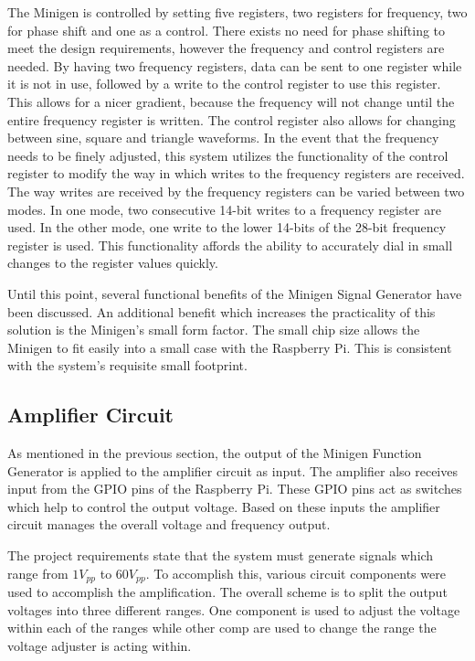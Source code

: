 \documentclass{article}	%
\begin{document}
\begin{multicols}{2}
The Minigen is controlled by setting five registers,
two registers for frequency, 
two for phase shift and 
one as a control. 
There exists no need for phase shifting
to meet the design requirements, 
however the frequency and control registers
are needed. 
By having two frequency registers,
data can be sent to one register while it is not in use,
followed by a write to the control register to use this register.
This allows for a nicer gradient, 
because the frequency will not change until the entire frequency register is written. 
The control register also allows for changing between sine, square and triangle waveforms.
In the event that the frequency needs to be finely adjusted,
this system utilizes the functionality of the control register
to modify the way in which writes to the frequency registers are received.
The way writes are received by the frequency registers 
can be varied between two modes.
In one mode,
two consecutive 14-bit writes to a frequency register are used.
In the other mode,
one write to the lower 14-bits of the 28-bit frequency register is used.
This functionality affords the ability to accurately dial in small changes to the register values quickly.

Until this point,
several functional benefits of the Minigen Signal Generator have been discussed.
An additional benefit which 
increases the practicality of this solution is the Minigen's small form factor.
The small chip size 
allows the Minigen to fit easily into a small case 
with the Raspberry Pi.
This is consistent with the system's requisite small footprint.

\subsection{Amplifier Circuit}
As mentioned in the previous section,
the output of the Minigen Function Generator
is applied to the amplifier circuit as input.
The amplifier also receives input from 
the GPIO pins of the Raspberry Pi.
These GPIO pins act as switches which help to control the output voltage.
Based on these inputs 
the amplifier circuit manages the overall 
voltage and frequency output.

The project requirements state that the system must 
generate signals which range from $1V_{pp}$ to $60V_{pp}$. 
To accomplish this,
various circuit components were used to accomplish the amplification.
The overall scheme is to split the output voltages into
three different ranges.
One component is used to adjust the voltage within each of the ranges while
other comp are used to change the range the voltage adjuster is acting within.


\end{multicols}
\end{document}
